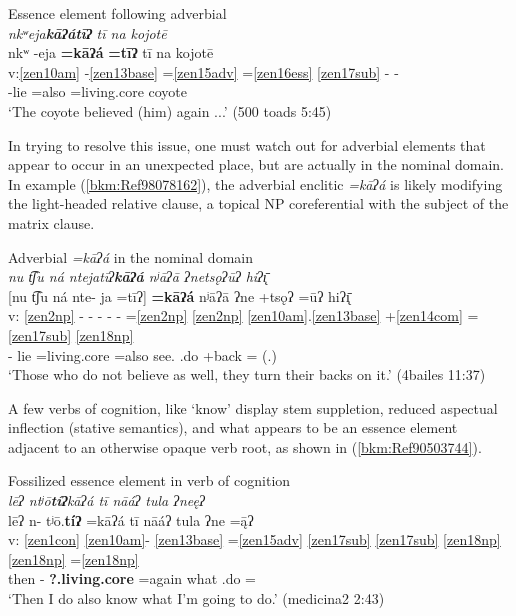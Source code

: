 \documentclass[output=paper]{langscibook}
\begin{document}
\newpage
\ea
\label{bkm:Ref90383592}Essence element following adverbial\\
\textit{ nkʷeja\textbf{kāʔátīʔ} tī na kojotē} \\  
\glll nkʷ -eja \textbf{=kāʔá} \textbf{=tīʔ} tī na kojotē\\
v:\ref{zen10am} {}-\ref{zen13base} =\ref{zen15adv} =\ref{zen16ess} \ref{zen17sub} - - \\
\Pfv{} {}-lie =also =living.core \Tplz{} \Def{} coyote\\
\glt `The coyote believed (him) again ...' (500 toads 5:45)
\z

In trying to resolve this issue, one must watch out for adverbial elements that appear to occur in an unexpected place, but are actually in the nominal domain. In example (\ref{bkm:Ref98078162}), the adverbial enclitic \textit{=kāʔá} is likely modifying the light-headed relative clause, a topical NP coreferential with the subject of the matrix clause.


\ea\label{bkm:Ref98078162} Adverbial \textit{=kāʔá} in the nominal domain\\
\textit{nu t͡ʃu ná ntejatīʔ\textbf{kāʔá} nʲāʔā ʔnetsǫʔūʔ hiʔ\={\k{ı}}} \\ 
\glll {} [nu t͡ʃu ná nte- ja =tīʔ] \textbf{=kāʔá} nʲāʔā ʔne +tsǫʔ =ūʔ hiʔ\={\k{ı}}\\
v: \ref{zen2np} - - - - - =\ref{zen2np} \ref{zen2np} \ref{zen10am}.\ref{zen13base} +\ref{zen14com} =\ref{zen17sub} \ref{zen18np} \\
{} \Sub{} \Hum{} \Neg{} \Prog{}- lie =living.core =also see.\Second\Sg{} \Pot{}.do +back =\Third\Pl{} \Dat{}(.\Third{})\\
\glt `Those who do not believe as well, they turn their backs on it.' (4bailes 11:37)
\z

A few verbs of cognition, like `know' display stem suppletion, reduced aspectual inflection (stative semantics), and what appears to be an essence element adjacent to an otherwise opaque verb root, as shown in (\ref{bkm:Ref90503744}).

\ea\label{bkm:Ref90503744}Fossilized essence element in verb of cognition\\
\textit{lēʔ ntʲō\textbf{tíʔ}kāʔá tī nāáʔ tula ʔneęʔ} \\ 
\glll {} lēʔ n- tʲō.\textbf{tíʔ} =kāʔá tī nāáʔ tula ʔne =\={ą}ʔ \\
v: \ref{zen1con} \ref{zen10am}{}- \ref{zen13base} =\ref{zen15adv} \ref{zen17sub} \ref{zen17sub} \ref{zen18np} \ref{zen18np} =\ref{zen18np} \\ 
{} then \Hab{}- \textbf{?.living.core} =again \Tplz{} \First\Sg{} what \Pot{}.do =\First\Sg{} \\
\glt `Then I do also know what I'm going to do.' (medicina2 2:43)
\z
\end{document}
